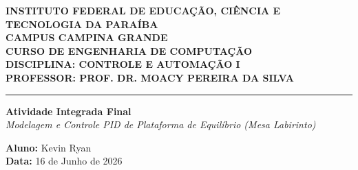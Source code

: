 \documentclass[12pt]{article}
\begin{document}
\begin{center}
    \begin{minipage}{0.2\textwidth}
    \end{minipage}
    \begin{minipage}{0.75\textwidth}
        \begin{center}
            \small\textbf{INSTITUTO FEDERAL DE EDUCAÇÃO, CIÊNCIA E TECNOLOGIA DA PARAÍBA} \\
            \small\textbf{CAMPUS CAMPINA GRANDE} \\
            \small\textbf{CURSO DE ENGENHARIA DE COMPUTAÇÃO} \\
            \small\textbf{DISCIPLINA: CONTROLE E AUTOMAÇÃO I} \\
            \small\textbf{PROFESSOR: PROF. DR. MOACY PEREIRA DA SILVA} \\
        \end{center}
    \end{minipage}
\end{center}

\vspace{0.2cm}
\hrule
\vspace{0.5cm}

\begin{center}
    \Large{\textbf{Atividade Integrada Final}} \\
    \large{\textit{Modelagem e Controle PID de Plataforma de Equilíbrio (Mesa Labirinto)}} \\
    \vspace{0.6cm}

    \large{\textbf{Aluno:} Kevin Ryan} \\
    \large{\textbf{Data:} 16 de Junho de 2026} \\
\end{center}

\vspace{0.8cm}

\end{document}
